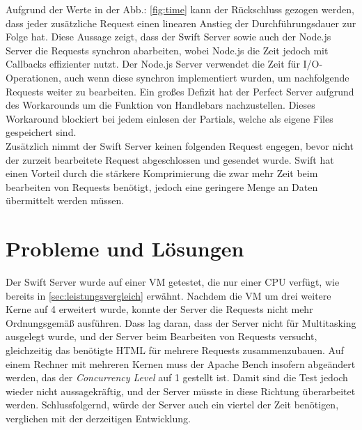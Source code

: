 Aufgrund der Werte in der Abb.: \ref{fig:time} kann der Rückschluss gezogen werden, dass jeder zusätzliche Request einen linearen Anstieg der Durchführungsdauer zur Folge hat. Diese Aussage zeigt, dass der Swift Server sowie auch der Node.js Server die Requests synchron abarbeiten, wobei Node.js die Zeit jedoch mit Callbacks effizienter nutzt. Der Node.js Server verwendet die Zeit für I/O-Operationen, auch wenn diese synchron implementiert wurden, um nachfolgende Requests weiter zu bearbeiten. Ein großes Defizit hat der Perfect Server aufgrund des Workarounds um die Funktion von Handlebars nachzustellen. Dieses Workaround blockiert bei jedem einlesen der Partials, welche als eigene Files gespeichert sind.\\
Zusätzlich nimmt der Swift Server keinen folgenden Request engegen, bevor nicht der zurzeit bearbeitete Request abgeschlossen und gesendet wurde. Swift hat einen Vorteil durch die stärkere Komprimierung die zwar mehr Zeit beim bearbeiten von Requests benötigt, jedoch eine geringere Menge an Daten übermittelt werden müssen.

\section{Probleme und Lösungen}
Der Swift Server wurde auf einer VM getestet, die nur einer CPU verfügt, wie bereits in \ref{sec:leistungsvergleich} erwähnt. Nachdem die VM um drei weitere Kerne auf 4 erweitert wurde, konnte der Server die Requests nicht mehr Ordnungsgemäß ausführen. Dass lag daran, dass der Server nicht für Multitasking ausgelegt wurde, und der Server beim Bearbeiten von Requests versucht, gleichzeitig das benötigte HTML für mehrere Requests zusammenzubauen. Auf einem Rechner mit mehreren Kernen muss der Apache Bench insofern abgeändert werden, das der \textit{Concurrency Level} auf 1 gestellt ist. Damit sind die Test jedoch wieder nicht aussagekräftig, und der Server müsste in diese Richtung überarbeitet werden. Schlussfolgernd, würde der Server auch ein viertel der Zeit benötigen, verglichen mit der derzeitigen Entwicklung.



